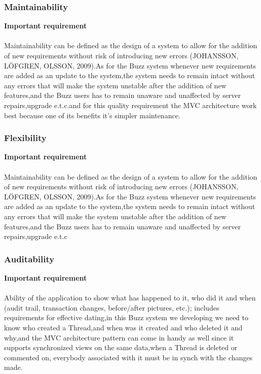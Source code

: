 \documentclass[a4paper]{article}
\begin{document}
\subsubsection{Maintainability}
\textbf{Important requirement}
\\
\\Maintainability can be defined as the design of a system to allow for the addition of new requirements without risk of introducing new errors (JOHANSSON, LÖFGREN, OLSSON, 2009).As for the Buzz system whenever new requirements are added as an update to the system,the system needs to remain intact without any errors that will make the system unstable after the addition of new features,and the Buzz users has to remain unaware and unaffected by server repairs,upgrade e.t.c.and for this quality requirement the MVC architecture work best because one of its benefits it's simpler maintenance.

\subsubsection{Flexibility}
\textbf{Important requirement}
\\
\\Maintainability can be defined as the design of a system to allow for the addition of new requirements without risk of introducing new errors (JOHANSSON, LÖFGREN, OLSSON, 2009).As for the Buzz system whenever new requirements are added as an update to the system,the system needs to remain intact without any errors that will make the system unstable after the addition of new features,and the Buzz users has to remain unaware and unaffected by server repairs,upgrade e.t.c


\subsubsection{Auditability}
\textbf{Important requirement}
\\
\\Ability of the application to show what has happened to it, who did it and when (audit trail, transaction changes, before/after pictures, etc.); includes requirements for effective dating,in this Buzz system we developing we need to know who created a Thread,and when was it created and who deleted it and why,and the MVC architecture pattern can come in handy as well since it supports synchronized views on the same data,when a Thread is deleted or commented on, everybody associated with it must be in synch with the changes made.
\end{document}

